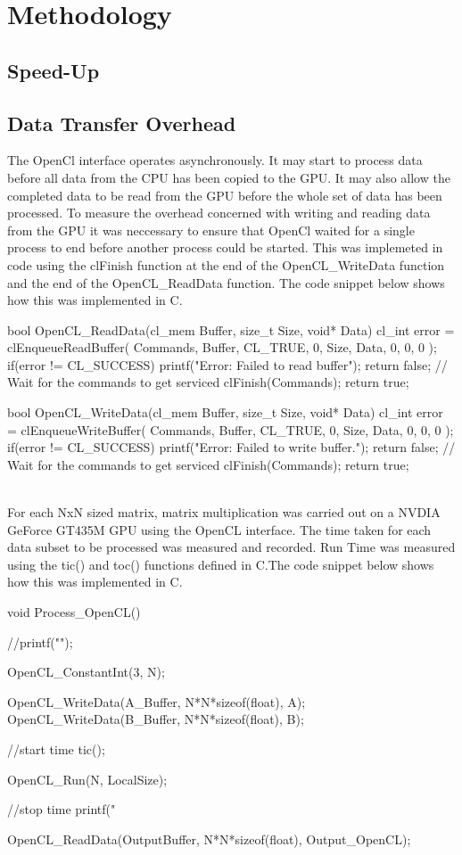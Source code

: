 \section{Methodology}

\subsection{Speed-Up}

\subsection{Data Transfer Overhead}
The OpenCl interface operates asynchronously. It may start to process data before all data from the CPU has been copied to the GPU. It may also allow the completed data to be read from the GPU before the whole set of data has been processed. To measure the overhead concerned with writing and reading data from the GPU it was neccessary to ensure that OpenCl waited for a single process to end before another process could be started. This was implemeted in code using the clFinish function at the end of the OpenCL\_WriteData function and the end of the OpenCL\_ReadData function. The code snippet below shows how this was implemented in C.

\begin{Cpp}
bool OpenCL_ReadData(cl_mem Buffer, size_t Size, void* Data){
	cl_int error = clEnqueueReadBuffer(
	Commands,
	Buffer,
	CL_TRUE,
	0,
	Size,
	Data,
	0, 0, 0
	);
	if(error != CL_SUCCESS){
		printf("Error: Failed to read buffer\n");
		return false;
	}
	// Wait for the commands to get serviced
	clFinish(Commands);
	return true;
}

bool OpenCL_WriteData(cl_mem Buffer, size_t Size, void* Data){
	cl_int error = clEnqueueWriteBuffer(
	Commands,
	Buffer,
	CL_TRUE,
	0,
	Size,
	Data,
	0, 0, 0
	);
	if(error != CL_SUCCESS){
		printf("Error: Failed to write buffer.\n");
		return false;
	}
	// Wait for the commands to get serviced
	clFinish(Commands);
	return true;
}
\end{Cpp}
\\
For each NxN sized matrix, matrix multiplication was carried out on a NVDIA GeForce GT435M GPU using the OpenCL interface. The time taken for each data subset to be processed was measured and recorded. Run Time was measured using the tic() and toc() functions defined in C.The code snippet below shows how this was implemented in C.

\begin{Cpp}


void Process_OpenCL(){
	//printf("\n");
	
	OpenCL_ConstantInt(3, N);
	
	OpenCL_WriteData(A_Buffer, N*N*sizeof(float), A);
	OpenCL_WriteData(B_Buffer, N*N*sizeof(float), B);
	
	//start time
	tic();
	
	OpenCL_Run(N, LocalSize);
	
	//stop time
	printf("%
	
	OpenCL_ReadData(OutputBuffer, N*N*sizeof(float), Output_OpenCL);
}
		
\end{Cpp}

\vspace{-11mm}